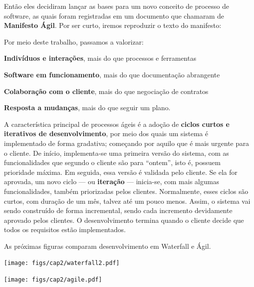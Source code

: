 \documentclass[
  11pt,
  twoside]{book}
\renewenvironment{quote}{\centering \vspace{1.5ex} \begin{tcolorbox}[colback=backcolor, width=4.9in]}{\end{tcolorbox}}
\let\origfigure\figure
\let\endorigfigure\endfigure
\renewenvironment{figure}[1][2] {
    \expandafter\origfigure\expandafter[!h]
} {
    \endorigfigure
}
\begin{document}
Então eles decidiram lançar as bases para um novo conceito de processo
de software, as quais foram registradas em um documento que chamaram de
\textbf{Manifesto Ágil}. Por ser curto, iremos reproduzir o texto do
manifesto:

\begin{quote}
Por meio deste trabalho, passamos a valorizar:

\textbf{Indivíduos e interações}, mais do que processos e ferramentas

\textbf{Software em funcionamento}, mais do que documentação abrangente

\textbf{Colaboração com o cliente}, mais do que negociação de contratos

\textbf{Resposta a mudanças}, mais do que seguir um plano.
\end{quote}

 A característica principal de processos ágeis é a
adoção de \textbf{ciclos curtos e iterativos de desenvolvimento}, por
meio dos quais um sistema é implementado de forma gradativa; começando
por aquilo que é mais urgente para o cliente. De início, implementa-se
uma primeira versão do sistema, com as funcionalidades que segundo o
cliente são para ``ontem'', isto é, possuem prioridade máxima. Em
seguida, essa versão é validada pelo cliente. Se ela for aprovada, um
novo ciclo --- ou \textbf{iteração} --- inicia-se, com mais algumas
funcionalidades, também priorizadas pelos clientes. Normalmente, esses
ciclos são curtos, com duração de um mês, talvez até um pouco menos.
Assim, o sistema vai sendo construído de forma incremental, sendo cada
incremento devidamente aprovado pelos clientes. O desenvolvimento
termina quando o cliente decide que todos os requisitos estão
implementados.

 As próximas figuras comparam desenvolvimento em
Waterfall e Ágil.

\begin{figure}
\centering
\texttt{[image: figs/cap2/waterfall2.pdf]}
\caption{Desenvolvimento usando um Processo Waterfall. O sistema fica
pronto apenas no final.}
\end{figure}

\begin{figure}
\centering
\texttt{[image: figs/cap2/agile.pdf]}
\caption{Desenvolvimento usando um Processo Ágil. A cada iteração
(representada pelos retângulos) gera-se um incremento no sistema (S++),
que já pode ser validado e testado pelos usuários finais.}
\end{figure}
\end{document}
